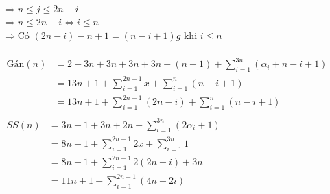 \documentclass[12pt, letterpaper]{article}
\begin{document}
{{{ \\
$\Rightarrow n \leq j \leq 2n - i$ \\
$\Rightarrow n \leq 2n - i \Leftrightarrow i \leq n$ \\
$\Rightarrow \text{Có } (2n - i) - n + 1 = (n - i + 1)g \text{ khi } i \leq n$\\
 \\
$ \begin{aligned}
	\text{Gán}(n) & = 2 + 3n + 3n + 3n + 3n + (n - 1) + \sum^{3n}_{i = 1} (\alpha_i + n - i + 1)\\
		& = 13n + 1 + \sum^{2n-1}_{i = 1} x + \sum^{n}_{i = 1} (n - i + 1) \\
		& = 13n + 1 + \sum^{2n-1}_{i = 1} (2n - i) + \sum^{n}_{i = 1} (n - i + 1) \\
\end{aligned} $ \\
$ \begin{aligned}
	SS(n) & = 3n + 1 + 3n + 2n + \sum^{3n}_{i = 1} (2 \alpha_i + 1) \\
		& = 8n + 1 +\sum^{2n-1}_{i = 1} 2x + \sum^{3n}_{i = 1} 1 \\
		& = 8n + 1 +\sum^{2n-1}_{i = 1} 2(2n - i) + 3n \\
		& = 11n + 1 +\sum^{2n-1}_{i = 1} (4n - 2i) \\
\end{aligned} $ \\

}}}
\end{document}
